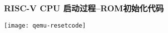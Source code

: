 \begin{frame}[plain]
	\frametitle{RISC-V CPU 启动过程--ROM初始化代码}
%		
%		
	
	\centering
	\texttt{[image: qemu-resetcode]}
\end{frame}





